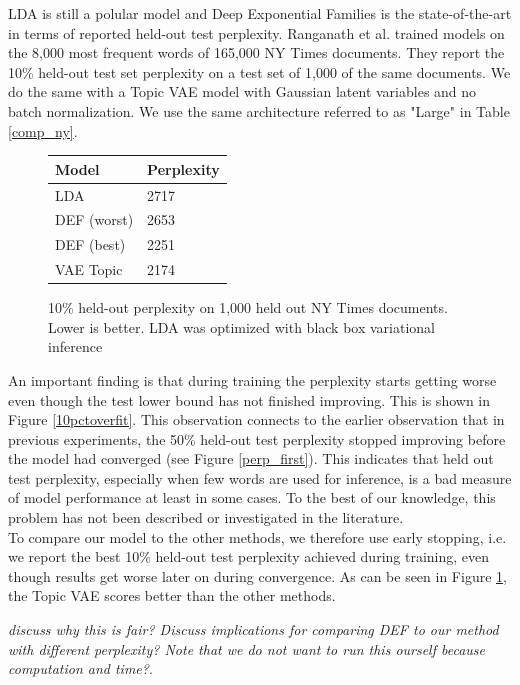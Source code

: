 \documentclass{report}
\begin{document}
	LDA is still a polular model and Deep Exponential Families is the state-of-the-art in terms of reported held-out test perplexity. Ranganath et al. \cite{ranganath2015deep} trained models on the 8,000 most frequent words of 165,000 NY Times documents. They report the 10\% held-out test set perplexity on a test set of 1,000 of the same documents. We do the same with a Topic VAE model with Gaussian latent variables and no batch normalization. We use the same architecture referred to as "Large" in Table \ref{comp_ny}. \\
	\begin{figure}
		\bgroup
		\def\arraystretch{1.2}
		\begin{tabular}{||l|l||}
			\hline \hline
			Model	& Perplexity\\ \hline \hline
			LDA	&  2717\\ \hline
			DEF (worst) & 2653 \\ \hline
			DEF (best) & 2251 \\ \hline
			VAE Topic & 2174 \\ \hline
		\end{tabular}
		
		\caption{10\% held-out perplexity on 1,000 held out NY Times documents. Lower is better. LDA was optimized with black box variational inference \cite{ranganath2014black}}
		\egroup
		\label{comp_def}
	\end{figure}
	An important finding is that during training the perplexity starts getting worse even though the test lower bound has not finished improving.	This is shown in Figure \ref{10pctoverfit}. This observation connects to the earlier observation that in previous experiments, the 50\% held-out test perplexity stopped improving before the model had converged (see Figure \ref{perp_first}). This indicates that held out test perplexity, especially when few words are used for inference, is a bad measure of model performance at least in some cases. To the best of our knowledge, this problem has not been described or investigated in the literature. \\
	To compare our model to the other methods, we therefore use early stopping, i.e. we report the best 10\% held-out test perplexity achieved during training, even though results get worse later on during convergence. As can be seen in Figure \ref{comp_def}, the Topic VAE scores better than the other methods. 

	
	\textit{discuss why this is fair? Discuss implications for comparing DEF to our method with different perplexity? Note that we do not want to run this ourself because computation and time?}. \\
	
\end{document}
